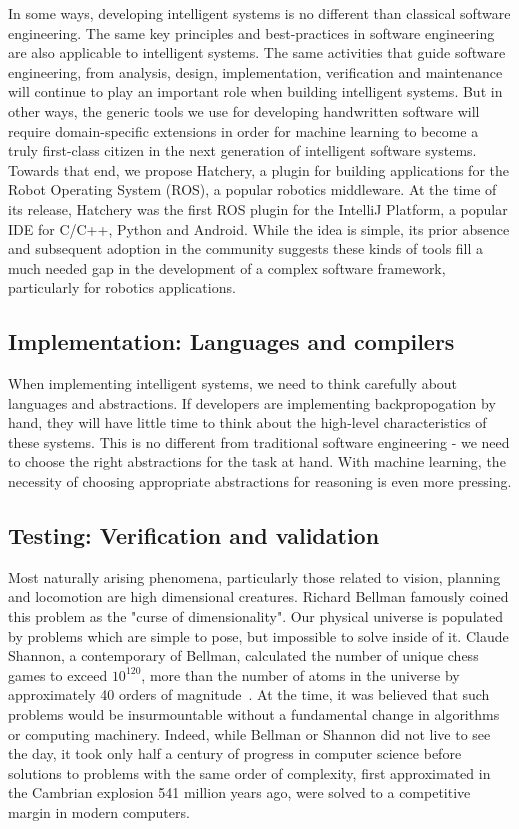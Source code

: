 \documentclass[12pt,initial,twoside,maitrise]{dms}
\numberwithin{equation}{section}
\numberwithin{table}{chapter}
\numberwithin{figure}{chapter}
\begin{document}
In some ways, developing intelligent systems is no different than classical software engineering. The same key principles and best-practices in software engineering are also applicable to intelligent systems. The same activities that guide software engineering, from analysis, design, implementation, verification and maintenance will continue to play an important role when building intelligent systems. But in other ways, the generic tools we use for developing handwritten software will require domain-specific extensions in order for machine learning to become a truly first-class citizen in the next generation of intelligent software systems. Towards that end, we propose Hatchery, a plugin for building applications for the Robot Operating System (ROS), a popular robotics middleware. At the time of its release, Hatchery was the first ROS plugin for the IntelliJ Platform, a popular IDE for C/C++, Python and Android. While the idea is simple, its prior absence and subsequent adoption in the community suggests these kinds of tools fill a much needed gap in the development of a complex software framework, particularly for robotics applications.

\subsection{Implementation: Languages and compilers}

When implementing intelligent systems, we need to think carefully about languages and abstractions. If developers are implementing backpropogation by hand, they will have little time to think about the high-level characteristics of these systems. This is no different from traditional software engineering - we need to choose the right abstractions for the task at hand. With machine learning, the necessity of choosing appropriate abstractions for reasoning is even more pressing.

\subsection{Testing: Verification and validation}

Most naturally arising phenomena, particularly those related to vision, planning and locomotion are high dimensional creatures. Richard Bellman famously coined this problem as the "curse of dimensionality". Our physical universe is populated by problems which are simple to pose, but impossible to solve inside of it. Claude Shannon, a contemporary of Bellman, calculated the number of unique chess games to exceed $10^{120}$, more than the number of atoms in the universe by approximately 40 orders of magnitude~\cite{shannon1950xxii}. At the time, it was believed that such problems would be insurmountable without a fundamental change in algorithms or computing machinery. Indeed, while Bellman or Shannon did not live to see the day, it took only half a century of progress in computer science before solutions to problems with the same order of complexity, first approximated in the Cambrian explosion 541 million years ago, were solved to a competitive margin in modern computers.
\end{document}
